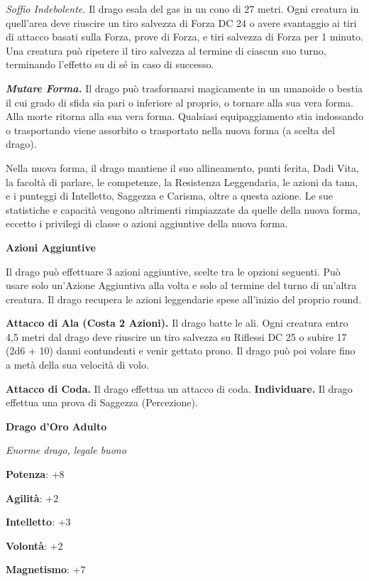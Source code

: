 \begin{multicols}{2}
\emph{Soffio Indebolente.} Il drago esala del gas in un cono di 27
metri. Ogni creatura in quell'area deve riuscire un tiro salvezza di Forza DC 24 o avere svantaggio ai tiri di attacco basati sulla Forza,
prove di Forza, e tiri salvezza di Forza per 1 minuto. Una creatura può
ripetere il tiro salvezza al termine di ciascun suo turno, terminando
l'effetto su di sé in caso di successo.

\emph{\textbf{Mutare Forma.}} Il drago può trasformarsi magicamente in
un umanoide o bestia il cui grado di sfida sia pari o inferiore al
proprio, o tornare alla sua vera forma. Alla morte ritorna alla sua vera
forma. Qualsiasi equipaggiamento stia indossando o trasportando viene
assorbito o trasportato nella nuova forma (a scelta del drago).

Nella nuova forma, il drago mantiene il suo allineamento, punti ferita,
Dadi Vita, la facoltà di parlare, le competenze, la Resistenza
Leggendaria, le azioni da tana, e i punteggi di Intelletto, Saggezza e
Carisma, oltre a questa azione. Le sue statistiche e capacità vengono
altrimenti rimpiazzate da quelle della nuova forma, eccetto i privilegi
di classe o azioni aggiuntive della nuova forma.

\textbf{Azioni Aggiuntive}

Il drago può effettuare 3 azioni aggiuntive, scelte tra le opzioni
seguenti. Può usare solo un'Azione Aggiuntiva alla volta e solo al
termine del turno di un'altra creatura. Il drago recupera le azioni
leggendarie spese all'inizio del proprio round.

\textbf{Attacco di Ala (Costa 2 Azioni).} Il drago batte le ali. Ogni
creatura entro 4,5 metri dal drago deve riuscire un tiro salvezza su Riflessi DC 25 o subire 17 (2d6 + 10) danni contundenti e venir gettato
prono. Il drago può poi volare fino a metà della sua velocità di volo.

\textbf{Attacco di Coda.} Il drago effettua un attacco di coda.
\textbf{Individuare.} Il drago effettua una prova di Saggezza
(Percezione).



\textbf{Drago d'Oro Adulto}

\emph{Enorme drago, legale buono}

\textbf{Potenza}: +8

\textbf{Agilità}: +2

\textbf{Intelletto}: +3

\textbf{Volontà}: +2

\textbf{Magnetismo}: +7


\end{multicols}
